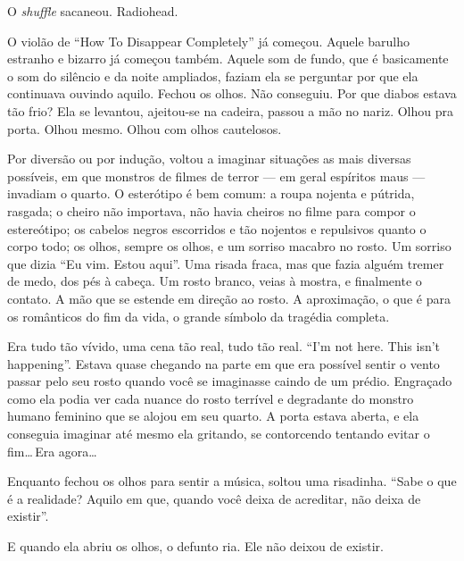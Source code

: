 O \emph{shuffle} sacaneou. Radiohead.

O violão de ``How To Disappear Completely'' já começou. Aquele barulho estranho e bizarro já começou também. Aquele som de fundo, que é basicamente o som do silêncio e da noite ampliados, faziam ela se perguntar por que ela continuava ouvindo aquilo. Fechou os olhos. Não conseguiu. Por que diabos estava tão frio? Ela se levantou, ajeitou-se na cadeira, passou a mão no nariz. Olhou pra porta. Olhou mesmo. Olhou com olhos cautelosos.

Por diversão ou por indução, voltou a imaginar situações as mais diversas possíveis, em que monstros de filmes de terror --- em geral espíritos maus --- invadiam o quarto. O esterótipo é bem comum: a roupa nojenta e pútrida, rasgada; o cheiro não importava, não havia cheiros no filme para compor o estereótipo; os cabelos negros escorridos e tão nojentos e repulsivos quanto o corpo todo; os olhos, sempre os olhos, e um sorriso macabro no rosto. Um sorriso que dizia ``Eu vim. Estou aqui''. Uma risada fraca, mas que fazia alguém tremer de medo, dos pés à cabeça. Um rosto branco, veias à mostra, e finalmente o contato. A mão que se estende em direção ao rosto. A aproximação, o que é para os românticos do fim da vida, o grande símbolo da tragédia completa.

Era tudo tão vívido, uma cena tão real, tudo tão real. ``I'm not here. This isn’t happening''. Estava quase chegando na parte em que era possível sentir o vento passar pelo seu rosto quando você se imaginasse caindo de um prédio. Engraçado como ela podia ver cada nuance do rosto terrível e degradante do monstro humano feminino que se alojou em seu quarto. A porta estava aberta, e ela conseguia imaginar até mesmo ela gritando, se contorcendo tentando evitar o fim\ldots\,Era agora\ldots

Enquanto fechou os olhos para sentir a música, soltou uma risadinha. ``Sabe o que é a realidade? Aquilo em que, quando você deixa de acreditar, não deixa de existir''.

E quando ela abriu os olhos, o defunto ria. Ele não deixou de existir.
